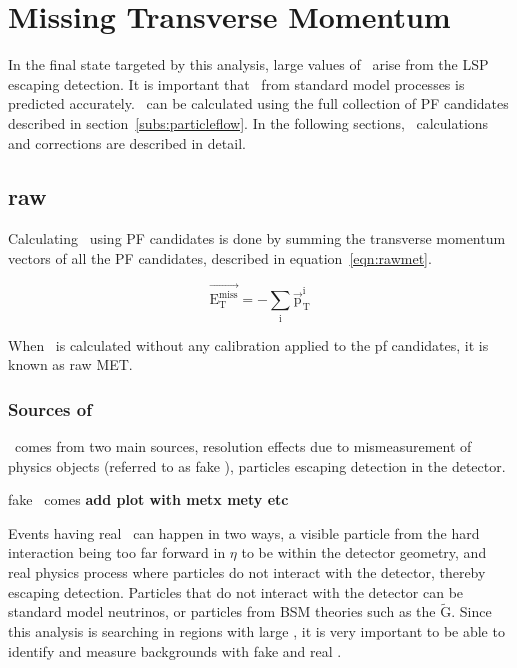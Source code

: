 \chapter{Missing Transverse Momentum}
\label{ch:MET}
In the final state targeted by this analysis, large values of \MET\ arise from the LSP escaping detection.
It is important that \MET\ from standard model processes is predicted accurately.
\MET\ can be calculated using the full collection of PF candidates described in section~\ref{subs:particleflow}.
In the following sections, \MET\ calculations and corrections are described in detail.

\section{raw \texorpdfstring{\MET}{MET}}

Calculating \MET\ using PF candidates is done by summing the transverse momentum vectors of all the PF candidates, described in equation~\ref{eqn:rawmet}.

\begin{equation}
  \label{eqn:rawmet}
\mathrm{\overrightarrow{E_{T}^{miss}} = -\sum_{i}\overrightarrow{p}_{T}^{i}}
\end{equation}

When \MET\ is calculated without any calibration applied to the pf candidates, it is known as raw MET.

\subsection{Sources of \texorpdfstring{\MET}{MET}}
\label{sec:metsources}
\MET\ comes from two main sources,
resolution effects due to mismeasurement of physics objects (referred to as fake \MET),
particles escaping detection in the detector.

fake \MET\ comes {\bf add plot with metx mety etc}

Events having real \MET\ can happen in two ways,
a visible particle from the hard interaction being too far forward in $\eta$ to be within the detector geometry,
and real physics process where particles do not interact with the detector, thereby escaping detection.
Particles that do not interact with the detector can be standard model neutrinos, or particles from BSM theories such as the $\mathrm{\tilde{G}}$.
Since this analysis is searching in regions with large \MET, it is very important to be able to identify and measure backgrounds with fake \MET and real \MET.

